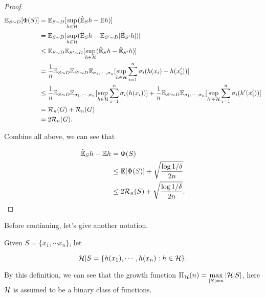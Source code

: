 \documentclass[../main.tex]{subfiles}
\begin{document}
\begin{proof}
		\begin{equation*}
			\begin{aligned}
				\mathbb{E}_{S \sim D}[\Phi(S)] & = \mathbb{E}_{S \sim D}[\sup\limits_{h\in \mathcal{H}} (\hat{\mathbb{E}}_S h - \mathbb{E} h )] \\
										& = \mathbb{E}_{S \sim D}[\sup\limits_{h\in \mathcal{H}} (\hat{\mathbb{E}}_S h - \mathbb{E}_{S' \sim D} [\hat{\mathbb{E}}_{S'} h ])]  \\
										& \leq \mathbb{E}_{S \sim D} \mathbb{E}_{S' \sim D} [\sup\limits_{h\in \mathcal{H}} (\hat{\mathbb{E}}_S h- \hat{\mathbb{E}}_{S'} h ) ] \\
										& = \frac{1}{n } \mathbb{E}_{S \sim D} \mathbb{E}_{S' \sim D}\mathbb{E}_{\sigma_1, \cdots, \sigma_n}  [\sup\limits_{h\in \mathcal{H}} \sum\limits_{i=1}^n \sigma_i (h(x_i) - h(x_i')) ] \\
										& \leq  \frac{1}{n } \mathbb{E}_{S \sim D}\mathbb{E}_{\sigma_1, \cdots, \sigma_n}  [\sup\limits_{h\in \mathcal{H}} \sum\limits_{i=1}^n \sigma_i (h(x_i))] + \frac{1}{n } \mathbb{E}_{S' \sim D}\mathbb{E}_{\sigma_1, \cdots, \sigma_n}  [\sup\limits_{h'\in \mathcal{H}} \sum\limits_{i=1}^n \sigma_i (h'(x_i'))] \\
										& = \mathcal{R}_n(G) + \mathcal{R}_n(G) \\
										& = 2\mathcal{R}_n(G).
			\end{aligned}
		\end{equation*}
		
		Combine all above, we can see that 
		
		\begin{equation*}
			\begin{aligned}
				\hat{\mathbb{E}}_S h - \mathbb{E} h & = \Phi(S) \\
									  & \leq \mathbb{E}[\Phi(S)] + \sqrt{\frac{\log 1 / \delta}{2n}} \\
									  & \leq 2 \mathcal{R}_n(S) + \sqrt{\frac{\log 1 / \delta}{2n}}.
			\end{aligned}
		\end{equation*}
	\end{proof}

	Before continuing, let's give another notation.
	
	\begin{notation}
		Given $S = \{x_1, \cdots x_n\}$, let
		
		\begin{equation*}
			\mathcal{H}|S = \{h(x_1), \cdots, h(x_n) : h\in \mathcal{H} \}.
		\end{equation*} 
	\end{notation}

	By this definition, we can see that the growth function $\Pi_{\mathcal{H}}(n) = \max\limits_{|S| = n} |\mathcal{H} | S|$, here $\mathcal{H}$ is assumed to be a binary class of functions.
	
\end{document}
